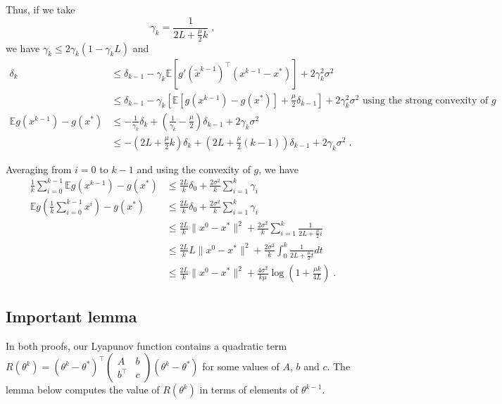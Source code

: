 \documentclass{article}
\def\E{_{\scriptscriptstyle E}}
\def \E{{\mathbb E}}
\def \E{{\mathbb E}}
\begin{document}
Thus, if we take
$$
\gamma_k = \frac{1}{2L +  \frac{\mu}{2}k} \; ,
$$
we have $\gamma_k \leqslant 2\gamma_k ( 1 - \gamma_k L )$ and
\begin{align*}
\delta_k & \leqslant \delta_{k-1} -  \gamma_k \E \left[ g'(\tilde{x}^{k-1})^\top ( x^{k-1} - x^\ast) \right] + 2 \gamma_k^2 \sigma^2\\
& \leqslant \delta_{k-1} -  \gamma_k \left[ \E \left[ g(x^{k-1}) - g(x^\ast)\right] + \frac{\mu}{2} \delta_{k-1} \right]   + 2 \gamma_k^2 \sigma^2 \textrm{ using the strong convexity of $g$}\\
\E g(x^{k-1}) - g(x^\ast) & \leqslant - \frac{1}{ \gamma_k} \delta_{k} + \left( \frac{1}{\gamma_k} - \frac{\mu}{2}\right) \delta_{k-1} + 2 \gamma_k \sigma^2 \\
& \leqslant - \left( 2L + \frac{\mu}{2}k\right) \delta_{k} + \left( 2L + \frac{\mu}{2}(k-1)\right) \delta_{k-1} + 2 \gamma_k \sigma^2 \; .
\end{align*}

Averaging from $i = 0$ to $k-1$ and using the convexity of $g$, we have
\begin{align*}
\frac{1}{k}\sum_{i=0}^{k-1}\E g(x^{k-1}) - g(x^\ast) & \leqslant \frac{2L}{k}\delta_{0} + \frac{2 \sigma^2 }{k} \sum_{i=1}^k \gamma_i \\
\E g \left( \frac{1}{k}\sum_{i=0}^{k-1} x^i \right) - g(x^\ast)
& \leqslant \frac{2L}{k} \delta_0 + \frac{2 \sigma^2 }{k} \sum_{i=1}^k \gamma_i \\
& \leqslant \frac{2L}{k}\| x^0 - x^\ast\|^2 + \frac{2 \sigma^2 }{k} \sum_{i=1}^k \frac{1}{2L +  \frac{\mu}{2}i}\\
& \leqslant \frac{2L}{k}L \| x^0 - x^\ast\|^2 + \frac{2 \sigma^2 }{k} \int_0^k \frac{1}{2L +  \frac{\mu}{2}t}dt\\
& \leqslant \frac{2L}{k}\| x^0 - x^\ast\|^2 + \frac{4 \sigma^2 }{k \mu} \log\left( 1 + \frac{\mu k }{4L } \right) \; .
\end{align*}

\subsection{Important lemma}

In both proofs, our Lyapunov function contains a quadratic term \mbox{$R(\theta^k) = (\theta^k - \theta^*)^\top \left(\begin{array}{cc} A & b \\ b^\top & c \end{array}\right) (\theta^k - \theta^*)$} for some values of $A$, $b$ and $c$. The lemma below computes the value of $R(\theta^k)$ in terms of elements of $\theta^{k-1}$.
\end{document}
